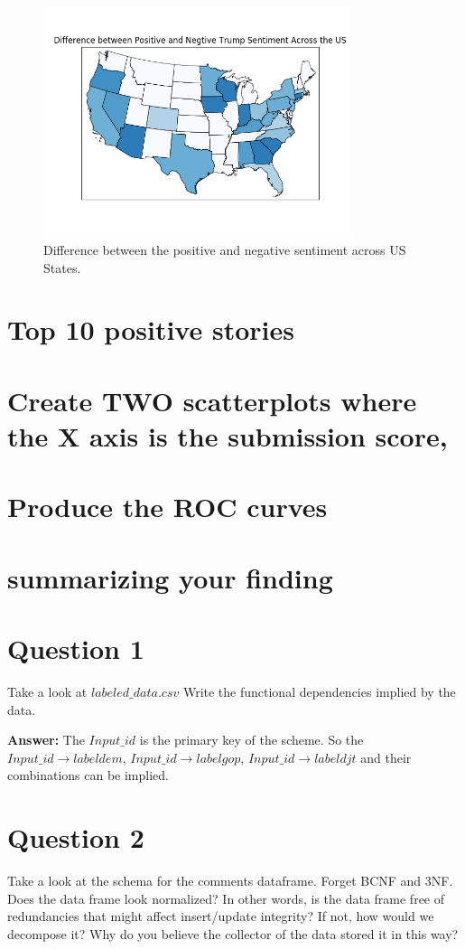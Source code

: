 \documentclass[12pt]{article}
\begin{document}
\begin{figure}[!h]
     \begin{center}
                  \includegraphics[width=0.8\textwidth]{../plots/part3.png}
    \end{center}
    \caption{%
       Difference between the positive and negative sentiment across US States.
     }%
     \label {fig:4}
 \end{figure}
 
 \section{Top 10 positive stories}
 \section{Create TWO scatterplots where the X axis is the submission score,}
 \section {Produce the ROC curves}
\section {summarizing your finding}
\section {Question 1}
Take a look at $labeled\_data.csv$ Write the functional dependencies implied by the data.

\textbf {Answer:} The $Input\_id$ is the primary key of the scheme. So the $Input\_id \to labeldem$,  $Input\_id \to labelgop$, $Input\_id \to labeldjt$ and their combinations can be implied. 
\section {Question 2}
Take a look at the schema for the comments dataframe. Forget BCNF and 3NF. Does the data frame look normalized? In other words, is the data frame free of redundancies that might affect insert/update integrity? If not, how would we decompose it? Why do you believe the collector of the data stored it in this way?
\end{document}
